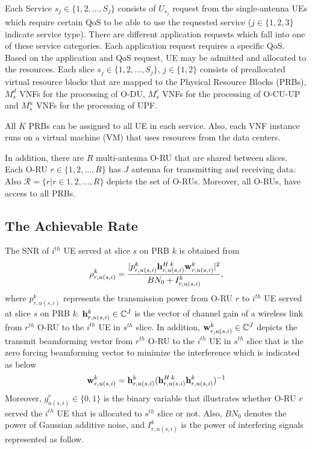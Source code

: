 \documentclass[conference]{IEEEtran}
\begin{document}
Each Service $s_j\in \{1,2,...,S_j\} $ consists of $U_{s_j}$ request from the single-antenna UEs which require certain QoS to be able to use the requested service ($j \in \{1,2,3\}$ indicate service type).
There are different application requests which fall into one of these service categories. Each application request requires a specific QoS. Based on the application and QoS request, UE may be admitted and allocated to the resources.
Each slice $s_j \in \{1,2,...,S_j \}$, $j \in \{1,2\}$ consists of  preallocated virtual resource blocks that are mapped to the Physical Resource Blocks (PRBs), $M_s^{d}$ VNFs for the processing of O-DU, $M_s^{c}$ VNFs for the processing of O-CU-UP and $M_s^{u}$ VNFs for the processing of UPF.

All $K$ PRBs can be assigned to all UE in each service.
Also, each VNF instance runs on a virtual machine (VM) that uses resources from the data centers.

In addition, there are $R$ multi-antenna O-RU that are shared between slices. Each O-RU $r \in \{1,2,...,R \}$
has $J$ antenna for transmitting and receiving data. Also $\mathcal{R} = \{ r | r\in 1,2,...,R \}$ depicts the set of O-RUs. Moreover, all O-RUs, have access to all PRBs.

\subsection{The Achievable Rate}
The SNR of $i^{th}$ UE served at slice $s$ on PRB $k$ is obtained from
\begin{equation}\label{eq1}
\rho_{r,u(s,i)}^{k} =  \frac{|p_{r,u(s,i)}^{k}{\bold{h}_{r,u(s,i)}^{H \: k}} \bold{w}_{r,u(s,i)}^{k}|^2}{BN_0 + I_{r,u(s,i)}^{k}},
\end{equation} 
where $p_{r,u(s,i)}^{k}$ represents the transmission power from O-RU $r$ to $i^{th}$ UE served at slice $s$ on PRB $k$. 
${\bold{h}_{r,u(s,i)}^{k}} \in \mathbb{C}^{J}$ is the vector of channel gain of a wireless link from 
$r^{th}$ O-RU to the $i^{th}$ UE in $s^{th}$ slice. In addition, $\bold{w}_{r,u(s,i)}^{k} \in \mathbb{C}^{J}$ depicts the  transmit beamforming vector from $r^{th}$ O-RU to the $i^{th}$ UE in $s^{th}$ slice that is the zero forcing beamforming vector to minimize the interference which is indicated as below
\begin{equation}
\bold{w}_{r,u(s,i)}^{k} = {\bold{h}_{r,u(s,i)}^{k}}({\bold{h}_{r,u(s,i)}^{H \: k}} {\bold{h}_{r,u(s,i)}^{k}})^{-1}
\end{equation}
Moreover, $g_{u(s,i)}^r \in \{0,1\}$ is the binary variable that illustrates whether O-RU $r$ served the $i^{th}$ UE that is allocated to $s^{th}$ slice or not. 
Also, $BN_0$ denotes the power of Gaussian additive noise, and $I_{r,u(s,i)}^{k}$ is the power of interfering signals represented as follow.
\end{document}
